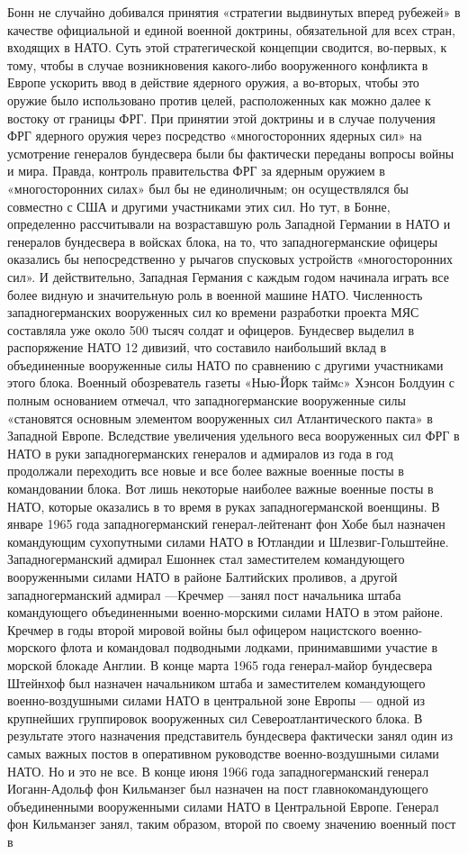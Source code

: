 \documentclass[12pt, a4paper, openany]{book}
\begin{document}
	Бонн не случайно добивался принятия «стратегии выдвинутых вперед рубежей» в качестве официальной и единой военной доктрины, обязательной для всех стран, входящих в НАТО. Суть этой стратегической концепции сводится, во-первых, к тому, чтобы в случае возникновения какого-либо вооруженного конфликта в Европе ускорить ввод в действие ядерного оружия, а во-вторых, чтобы это оружие было использовано против целей, расположенных как можно далее к востоку от границы ФРГ. При принятии этой доктрины и в случае получения ФРГ ядерного оружия через посредство «многосторонних ядерных сил» на усмотрение генералов бундесвера были бы фактически переданы вопросы войны и мира. Правда, контроль правительства ФРГ за ядерным оружием в «многосторонних силах» был бы не единоличным; он осуществлялся бы совместно с США и другими участниками этих сил. Но тут, в Бонне, определенно рассчитывали на возраставшую роль Западной Германии в НАТО и генералов бундесвера в войсках блока, на то, что западногерманские офицеры оказались бы непосредственно у рычагов спусковых устройств «многосторонних сил». И действительно, Западная Германия с каждым годом начинала играть все более видную и значительную роль в военной машине НАТО. Численность западногерманских вооруженных сил ко времени разработки проекта МЯС составляла уже около 500 тысяч солдат и офицеров. Бундесвер выделил в распоряжение НАТО 12 дивизий, что составило наибольший вклад в объединенные вооруженные силы НАТО по сравнению с другими участниками этого блока. Военный обозреватель газеты «Нью-Йорк таймc» Хэнсон Болдуин с полным основанием отмечал, что западногерманские вооруженные силы «становятся основным элементом вооруженных сил Атлантического пакта» в Западной Европе. Вследствие увеличения удельного веса вооруженных сил ФРГ в НАТО в руки западногерманских генералов и адмиралов из года в год продолжали переходить все новые и все более важные военные посты в командовании блока. Вот лишь некоторые наиболее важные военные посты в НАТО, которые оказались в то время в руках западногерманской военщины. В январе 1965 года западногерманский генерал-лейтенант фон Хобе был назначен командующим сухопутными силами НАТО в Ютландии и Шлезвиг-Гольштейне. Западногерманский адмирал Ешоннек стал заместителем командующего вооруженными силами НАТО в районе Балтийских проливов, а другой западногерманский адмирал —Кречмер —занял пост начальника штаба командующего объединенными военно-морскими силами НАТО в этом районе. Кречмер в годы второй мировой войны был офицером нацистского военно-морского флота и командовал подводными лодками, принимавшими участие в морской блокаде Англии. В конце марта 1965 года генерал-майор бундесвера Штейнхоф был назначен начальником штаба и заместителем командующего военно-воздушными силами НАТО в центральной зоне Европы — одной из крупнейших группировок вооруженных сил Североатлантического блока. В результате этого назначения представитель бундесвера фактически занял один из самых важных постов в оперативном руководстве военно-воздушными силами НАТО. Но и это не все. В конце июня 1966 года западногерманский генерал Иоганн-Адольф фон Кильманзег был назначен на пост главнокомандующего объединенными вооруженными силами НАТО в Центральной Европе. Генерал фон Кильманзег занял, таким образом, второй по своему значению военный пост в 
\end{document}
